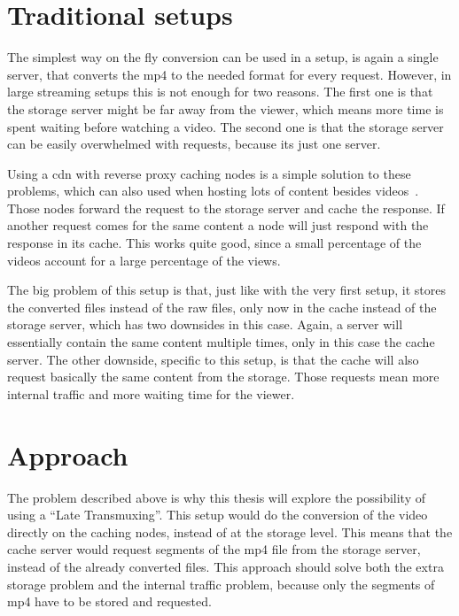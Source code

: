 \documentclass[twoside,openright]{uva-bachelor-thesis}
\begin{document}
\section{Traditional setups}
The simplest way on the fly conversion can be used in a setup, is again a
single server, that converts the mp4 to the needed format for every request.
However, in large streaming setups this is not enough for two reasons. The first
one is that the storage server might be far away from the viewer, which means
more time is spent waiting before watching a video. The second one is that the
storage server can be easily overwhelmed with requests, because its just one
server.

Using a \gls{cdn} with reverse proxy caching nodes is a simple solution to these
problems, which can also used when hosting lots of content besides
videos~\autocites{cdns}{revproxy}. Those nodes forward the request to the
storage server and cache the response. If another request comes for the same
content a node will just respond with the response in its cache. This works
quite good, since a small percentage of the videos account for a large
percentage of the views.

The big problem of this setup is that, just like with the very first setup, it
stores the converted files instead of the raw files, only now in the cache
instead of the storage server, which has two downsides in this case. Again, a
server will essentially contain the same content multiple times, only in this
case the cache server. The other downside, specific to this setup, is that the
cache will also request basically the same content from the storage. Those
requests mean more internal traffic and more waiting time for the viewer.

\section{Approach}
The problem described above is why this thesis will explore the possibility of
using a ``Late Transmuxing''. This setup would do the conversion of the video
directly on the caching nodes, instead of at the storage level. This means that
the cache server would request segments of the mp4 file from the storage server,
instead of the already converted files. This approach should solve both the
extra storage problem and the internal traffic problem, because only the segments
of mp4 have to be stored and requested.
\end{document}

